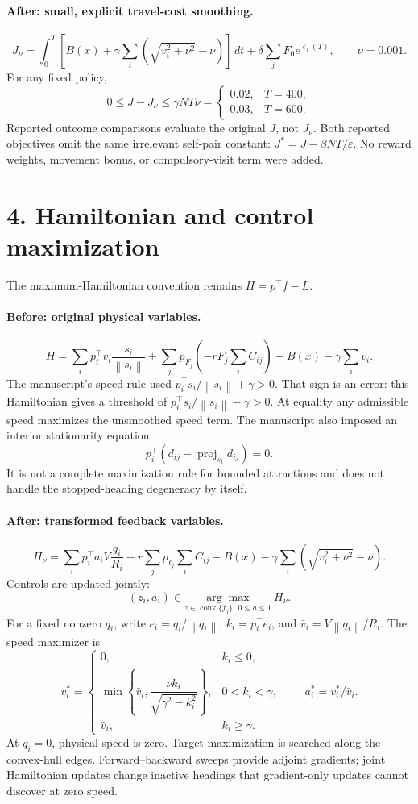 \documentclass[11pt]{article}
\newcommand{\norm}[1]{\left\lVert #1\right\rVert}
\begin{document}
\paragraph{After: small, explicit travel-cost smoothing.}
\[
J_\nu=\int_0^T\left[
 B(x)+\gamma\sum_i\left(\sqrt{v_i^2+\nu^2}-\nu\right)
 \right]\,dt+\delta\sum_j F_0e^{\ell_j(T)},
\qquad \nu=0.001.
\]
For any fixed policy,
\[
0\leq J-J_\nu\leq\gamma NT\nu
=\begin{cases}0.02,&T=400,\\0.03,&T=600.\end{cases}
\]
Reported outcome comparisons evaluate the original \(J\), not \(J_\nu\).
Both reported objectives omit the same irrelevant self-pair constant:
\(J^*=J-\beta NT/\varepsilon\).
No reward weights, movement bonus, or compulsory-visit term were added.

\section*{4. Hamiltonian and control maximization}
The maximum-Hamiltonian convention remains \(H=p^\top f-L\).

\paragraph{Before: original physical variables.}
\[
H=\sum_i p_i^\top v_i\frac{s_i}{\norm{s_i}}
  +\sum_jp_{F_j}\left(-rF_j\sum_iC_{ij}\right)
  -B(x)-\gamma\sum_i v_i .
\]
The manuscript's speed rule used \(p_i^\top s_i/\norm{s_i}+\gamma>0\).
That sign is an error: this Hamiltonian gives a threshold of
\(p_i^\top s_i/\norm{s_i}-\gamma>0\).
At equality any admissible speed maximizes the unsmoothed speed term.
The manuscript also imposed an interior stationarity equation
\[
p_i^\top\left(d_{ij}-\operatorname{proj}_{s_i}d_{ij}\right)=0.
\]
It is not a complete maximization rule for bounded attractions and does
not handle the stopped-heading degeneracy by itself.

\paragraph{After: transformed feedback variables.}
\[
H_\nu=\sum_i p_i^\top a_iV\frac{q_i}{R_i}
 -r\sum_jp_{\ell_j}\sum_iC_{ij}
 -B(x)-\gamma\sum_i\left(\sqrt{v_i^2+\nu^2}-\nu\right).
\]
Controls are updated jointly:
\[
(z_i,a_i)\in\underset{
 z\in\operatorname{conv}\{f_j\},\ 0\leq a\leq1}
 {\arg\max}\ H_\nu .
\]
For a fixed nonzero \(q_i\), write \(e_i=q_i/\norm{q_i}\),
\(k_i=p_i^\top e_i\), and
\(\bar v_i=V\norm{q_i}/R_i\). The speed maximizer is
\[
v_i^*=
\begin{cases}
0,&k_i\leq0,\\
\min\left\{\bar v_i,\dfrac{\nu k_i}{\sqrt{\gamma^2-k_i^2}}\right\},
  &0<k_i<\gamma,\\
\bar v_i,&k_i\geq\gamma.
\end{cases}
\qquad
a_i^*=v_i^*/\bar v_i .
\]
At \(q_i=0\), physical speed is zero. Target maximization is searched along
the convex-hull edges. Forward--backward sweeps provide adjoint gradients;
joint Hamiltonian updates change inactive headings that gradient-only
updates cannot discover at zero speed.
\end{document}
